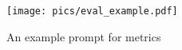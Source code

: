 \begin{figure}
    \centering
    \texttt{[image: pics/eval\_example.pdf]}
    \vspace{-7pt}
    \caption{An example prompt 
    for metrics
    }
    \label{fig:metrics}
    \vspace{-10pt}
\end{figure}
